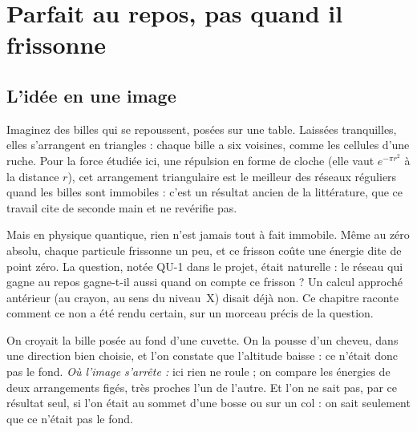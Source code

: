 \chapter{Parfait au repos, pas quand il frissonne}


\section*{L'idée en une image}

Imaginez des billes qui se repoussent, posées sur une table. Laissées tranquilles, elles
s'arrangent en triangles : chaque bille a six voisines, comme les cellules d'une ruche. Pour
la force étudiée ici, une répulsion en forme de cloche (elle vaut $e^{-\pi r^2}$ à la distance
$r$), cet arrangement triangulaire est le meilleur des réseaux réguliers quand les billes sont
immobiles : c'est un résultat ancien de la littérature, que ce travail cite de seconde main et ne revérifie pas.

Mais en physique quantique, rien n'est jamais tout à fait immobile. Même au zéro absolu, chaque
particule frissonne un peu, et ce frisson coûte une énergie dite \og de point zéro\fg{}. La
question, notée QU-1 dans le projet, était naturelle : le réseau qui gagne au repos gagne-t-il
aussi quand on compte ce frisson ? Un calcul approché antérieur (au crayon, au sens du
niveau~X) disait déjà non. Ce chapitre raconte comment ce \og non\fg{} a été rendu certain, sur
un morceau précis de la question.

\begin{analogie}
On croyait la bille posée au fond d'une cuvette. On la pousse d'un cheveu, dans une direction
bien choisie, et l'on constate que l'altitude baisse : ce n'était donc pas le fond.
\emph{Où l'image s'arrête :} ici rien ne roule ; on compare les énergies de deux arrangements
figés, très proches l'un de l'autre. Et l'on ne sait pas, par ce résultat seul, si l'on était
au sommet d'une bosse ou sur un col : on sait seulement que ce n'était pas le fond.
\end{analogie}


